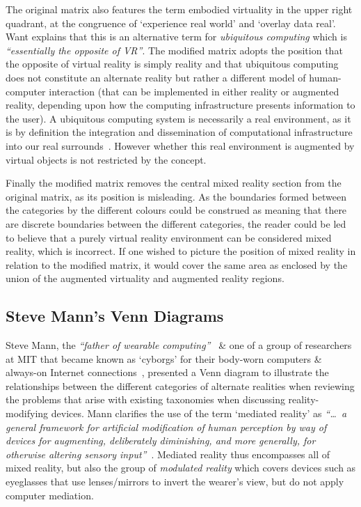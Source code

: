 The original matrix also features the term embodied virtuality in the upper right quadrant, at the congruence of `experience real world' and `overlay data real'. Want explains that this is an alternative term for \textit{ubiquitous computing} which is \textit{``essentially the opposite of VR''}. The modified matrix adopts the position that the opposite of virtual reality is simply reality and that ubiquitous computing does not constitute an alternate reality but rather a different model of human-computer interaction (that can be implemented in either reality or augmented reality, depending upon how the computing infrastructure presents information to the user). A ubiquitous computing system is necessarily a real environment, as it is by definition the integration and dissemination of computational infrastructure into our real surrounds~\cite{York2004}. However whether this real environment is augmented by virtual objects is not restricted by the concept.

Finally the modified matrix removes the central mixed reality section from the original matrix, as its position is misleading. As the boundaries formed between the categories by the different colours could be construed as meaning that there are discrete boundaries between the different categories, the reader could be led to believe that a purely virtual reality environment can be considered mixed reality, which is incorrect. If one wished to picture the position of mixed reality in relation to the modified matrix, it would cover the same area as enclosed by the union of the augmented virtuality and augmented reality regions.


\subsection{Steve Mann's Venn Diagrams}
\label{stevemannvenn}
Steve Mann, the \textit{``father of wearable computing''}~\cite{Schofield2012} \& one of a group of researchers at MIT that became known as `cyborgs' for their body-worn computers \& always-on Internet connections~\cite{Turkle2011}, presented a Venn diagram to illustrate the relationships between the different categories of alternate realities when reviewing the problems that arise with existing taxonomies when discussing reality-modifying devices. Mann clarifies the use of the term `mediated reality' as \textit{``\ldots\ a general framework for artificial modification of human perception by way of devices for augmenting, deliberately diminishing, and more generally, for otherwise altering sensory input''}~\cite{Mann2002a}. Mediated reality thus encompasses all of mixed reality, but also the group of \textit{modulated reality} which covers devices such as eyeglasses that use lenses/mirrors to invert the wearer's view, but do not apply computer mediation.

